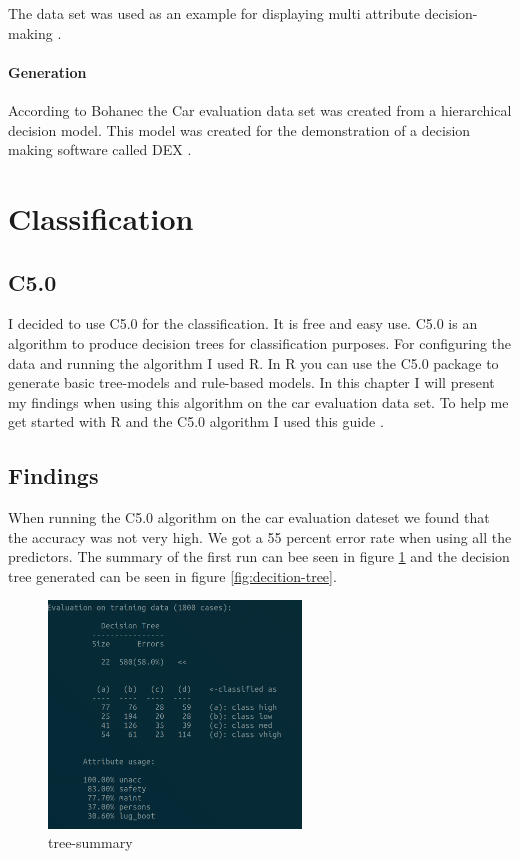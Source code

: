 \documentclass[a4paper, 12pt]{article}
\begin{document}
The data set was used as an example for displaying multi attribute decision-making \cite{dataset-usage}.

\paragraph{Generation}
According to Bohanec the Car evaluation data set was created from a hierarchical decision model. This model was created for the demonstration of a decision making software called DEX \cite{dataset}.

\section{Classification}
\subsection{C5.0}
I decided to use C5.0 for the classification. It is free and easy use. C5.0 is an algorithm to produce decision trees for classification purposes. For configuring the data and running the algorithm I used R. In R you can use the C5.0 package to generate basic tree-models and rule-based models. In this chapter I will present my findings when using this algorithm on the car evaluation data set. To help me get started with R and the C5.0 algorithm I used this guide \cite{guide}.

\subsection{Findings}
When running the C5.0 algorithm on the car evaluation dateset we found that the accuracy was not very high. We got a 55 percent error rate when using all the predictors. The summary of the first run can bee seen in figure \ref{fig:tree-summary} and the decision tree generated can be seen in figure \ref{fig:decition-tree}.
  \begin{figure}[h]
    \centering 
    \includegraphics[width=0.6\textwidth]
    {images/summary}
    \caption{tree-summary}
    \label{fig:tree-summary}
  \end{figure}
\end{document}
